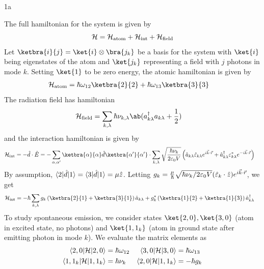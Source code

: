 \documentclass[12pt]{article}
\begin{document}
\begin{exc}{1a}
\end{exc}
\begin{ans}
    The full hamiltonian for the system is given by 
    \[\mathcal{H} = \mathcal{H}_{\text{atom}} + \mathcal{H}_{\text{int}} + \mathcal{H}_{\text{field}} \]
    Let $\ketbra{i}{j} = \ket{i} \otimes \bra{j_k}$ be a basis for the system with $\ket{i}$ being eigenstates of the atom and $\ket{j_k}$ representing a field with $j$ photons in mode $k$. Setting $\ket{1}$ to be zero energy, the atomic hamiltonian is given by
    \begin{align*}
        \HH_{\text{atom}}&= \hbar\omega_{12}\ketbra{2}{2} + \hbar\omega_{13}\ketbra{3}{3}
    \end{align*}
    The radiation field has hamiltonian 
    \begin{align*}
        \HH_{\text{field}} &= \sum_{k, \lambda} \hbar\nu_{k,\lambda}\ab(a_{k\lambda}^\dagger a_{k\lambda} + \frac{1}{2})
    \end{align*}
    and the interaction hamiltonian is given by 
    \begin{align*}
        \HH_{\text{int}} &= - \hat d \cdot \hat E = -\sum_{\alpha, \alpha'} \ketbra{\alpha}{\alpha} \hat d \ketbra{\alpha'}{\alpha'} \cdot \sum_{k, \lambda} \sqrt{\frac{\hbar \nu_k}{2\e_0 V}} \left(\hat a_{k\lambda}\hat \e_{k\lambda}e^{i\vec k \cdot \vec r} + \hat a_{k\lambda}^\dagger \e_{k\lambda}^* e^{-i\vec k \cdot \vec r}\right)
    \end{align*}
    By assumption, $\uelem{2}{\hat d}{1} = \uelem{3}{\hat d}{1} = \mu \vu z$. Letting $g_k = \frac{\mu}{\hbar}\sqrt{\hbar \nu_k/2\varepsilon_0 V}(\hat {\varepsilon}_k \cdot \hat z) e^{i\vec k \cdot \vec r}$, we get  
    \begin{align*}
        \HH_{\text{int}} &= -\hbar\sum_{k, \lambda} g_k \left(\ketbra{2}{1} + \ketbra{3}{1}\right) \hat a_{k\lambda} + g_k^* \left(\ketbra{1}{2} + \ketbra{1}{3}\right) \hat a_{k\lambda}^\dagger
    \end{align*}
    To study spontaneous emission, we consider states $\ket{2, 0}, \ket{3, 0}$ (atom in excited state, no photons) and $\ket{1, 1_k}$ (atom in ground state after emitting photon in mode $k$). We evaluate the matrix elements as 
    \begin{align*}
        \uelem{2, 0}{\HH}{2, 0} &= \hbar \omega_{12} & \uelem{3, 0}{\HH}{3, 0} &= \hbar \omega_{13}\\
        \uelem{1, 1_k}{\HH}{1, 1_k} &= \hbar \nu_k & \uelem{2, 0}{\HH}{1, 1_k} &= -\hbar g_k \\

\end{align*}
\end{ans}
\end{document}
